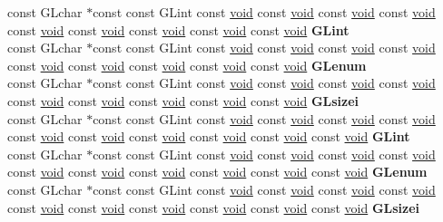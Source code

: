 \begin{DoxyCompactItemize}
\begin{tabbing}
\>const GLchar $\ast$const const GLint const \hyperlink{interfacevoid}{void} const \hyperlink{interfacevoid}{void} const \hyperlink{interfacevoid}{void} const \hyperlink{interfacevoid}{void} const \hyperlink{interfacevoid}{void} const \hyperlink{interfacevoid}{void} const \hyperlink{interfacevoid}{void} const \hyperlink{interfacevoid}{void} const \hyperlink{interfacevoid}{void} {\bfseries GLint}\\
\>const GLchar $\ast$const const GLint const \hyperlink{interfacevoid}{void} const \hyperlink{interfacevoid}{void} const \hyperlink{interfacevoid}{void} const \hyperlink{interfacevoid}{void} const \hyperlink{interfacevoid}{void} const \hyperlink{interfacevoid}{void} const \hyperlink{interfacevoid}{void} const \hyperlink{interfacevoid}{void} const \hyperlink{interfacevoid}{void} {\bfseries GLenum}\\
\>const GLchar $\ast$const const GLint const \hyperlink{interfacevoid}{void} const \hyperlink{interfacevoid}{void} const \hyperlink{interfacevoid}{void} const \hyperlink{interfacevoid}{void} const \hyperlink{interfacevoid}{void} const \hyperlink{interfacevoid}{void} const \hyperlink{interfacevoid}{void} const \hyperlink{interfacevoid}{void} const \hyperlink{interfacevoid}{void} {\bfseries GLsizei}\\
\>const GLchar $\ast$const const GLint const \hyperlink{interfacevoid}{void} const \hyperlink{interfacevoid}{void} const \hyperlink{interfacevoid}{void} const \hyperlink{interfacevoid}{void} const \hyperlink{interfacevoid}{void} const \hyperlink{interfacevoid}{void} const \hyperlink{interfacevoid}{void} const \hyperlink{interfacevoid}{void} const \hyperlink{interfacevoid}{void} const \hyperlink{interfacevoid}{void} {\bfseries GLint}\\
\>const GLchar $\ast$const const GLint const \hyperlink{interfacevoid}{void} const \hyperlink{interfacevoid}{void} const \hyperlink{interfacevoid}{void} const \hyperlink{interfacevoid}{void} const \hyperlink{interfacevoid}{void} const \hyperlink{interfacevoid}{void} const \hyperlink{interfacevoid}{void} const \hyperlink{interfacevoid}{void} const \hyperlink{interfacevoid}{void} const \hyperlink{interfacevoid}{void} {\bfseries GLenum}\\
\>const GLchar $\ast$const const GLint const \hyperlink{interfacevoid}{void} const \hyperlink{interfacevoid}{void} const \hyperlink{interfacevoid}{void} const \hyperlink{interfacevoid}{void} const \hyperlink{interfacevoid}{void} const \hyperlink{interfacevoid}{void} const \hyperlink{interfacevoid}{void} const \hyperlink{interfacevoid}{void} const \hyperlink{interfacevoid}{void} const \hyperlink{interfacevoid}{void} {\bfseries GLsizei}\\

\end{tabbing}
\end{DoxyCompactItemize}
